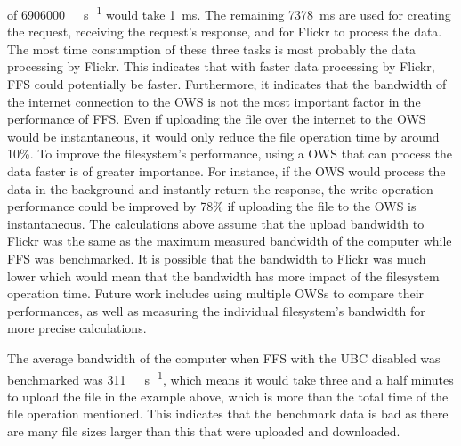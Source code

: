 of \SI[per-mode = symbol]{6906000}{\kilo\byte\per\second} would take \SI[per-mode = symbol]{1}{\milli\second}. The remaining \SI[per-mode = symbol]{7378}{\milli\second} are used for creating the request, receiving the request's response, and for Flickr to process the data. The most time consumption of these three tasks is most probably the data processing by Flickr. This indicates that with faster data processing by Flickr, \gls{FFS} could potentially be faster. Furthermore, it indicates that the bandwidth of the internet connection to the \gls{OWS} is not the most important factor in the performance of \gls{FFS}. Even if uploading the file over the internet to the \gls{OWS} would be instantaneous, it would only reduce the file operation time by around 10\%. To improve the filesystem's performance, using a \gls{OWS} that can process the data faster is of greater importance. For instance, if the \gls{OWS} would process the data in the background and instantly return the response, the write operation performance could be improved by 78\% if uploading the file to the \gls{OWS} is instantaneous. The calculations above assume that the upload bandwidth to Flickr was the same as the maximum measured bandwidth of the computer while \gls{FFS} was benchmarked. It is possible that the bandwidth to Flickr was much lower which would mean that the bandwidth has more impact of the filesystem operation time. Future work includes using multiple \glspl{OWS} to compare their performances, as well as measuring the individual filesystem's bandwidth for more precise calculations.

The average bandwidth of the computer when \gls{FFS} with the \gls{UBC} disabled was benchmarked was \SI[per-mode = symbol]{311}{\kilo\bit\per\second}, which means it would take three and a half minutes to upload the file in the example above, which is more than the total time of the file operation mentioned. This indicates that the benchmark data is bad as there are many file sizes larger than this that were uploaded and downloaded.

